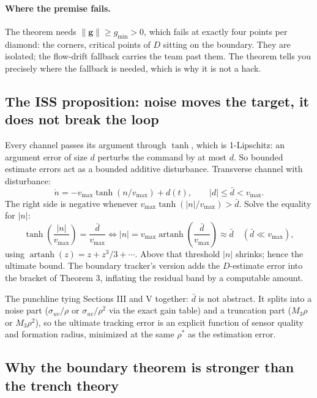 \documentclass[11pt]{article}
\begin{document}
\paragraph{Where the premise fails.} The theorem needs
$\|\mathbf{g}\| \geq g_{\min} > 0$, which fails at exactly four points per
diamond: the corners, critical points of $D$ sitting on the boundary. They
are isolated; the flow-drift fallback carries the team past them. The
theorem tells you precisely where the fallback is needed, which is why it
is not a hack.

\subsection{The ISS proposition: noise moves the target, it does not break the loop}

Every channel passes its argument through $\tanh$, which is 1-Lipschitz:
an argument error of size $d$ perturbs the command by at most $d$. So
bounded estimate errors act as a bounded additive disturbance. Transverse
channel with disturbance:
\begin{equation}
\dot{n} = -v_{\max}\tanh(n/v_{\max}) + d(t), \qquad |d| \leq \bar{d} < v_{\max}.
\end{equation}
The right side is negative whenever
$v_{\max}\tanh(|n|/v_{\max}) > \bar{d}$. Solve the equality for $|n|$:
\begin{equation}
\tanh\!\left(\frac{|n|}{v_{\max}}\right) = \frac{\bar{d}}{v_{\max}}
\iff
|n| = v_{\max}\operatorname{artanh}\!\left(\frac{\bar{d}}{v_{\max}}\right)
\approx \bar{d} \quad (\bar{d} \ll v_{\max}),
\end{equation}
using $\operatorname{artanh}(z) = z + z^3/3 + \cdots$. Above that
threshold $|n|$ shrinks; hence the ultimate bound. The boundary tracker's
version adds the $D$-estimate error into the bracket of Theorem 3,
inflating the residual band by a computable amount.

The punchline tying Sections III and V together: $\bar{d}$ is not
abstract. It splits into a noise part ($\sigma_{uv}/\rho$ or
$\sigma_{uv}/\rho^2$ via the exact gain table) and a truncation part
($M_3\rho$ or $M_3\rho^2$), so the ultimate tracking error is an explicit
function of sensor quality and formation radius, minimized at the same
$\rho^*$ as the estimation error.

\subsection{Why the boundary theorem is stronger than the trench theory}
\end{document}
